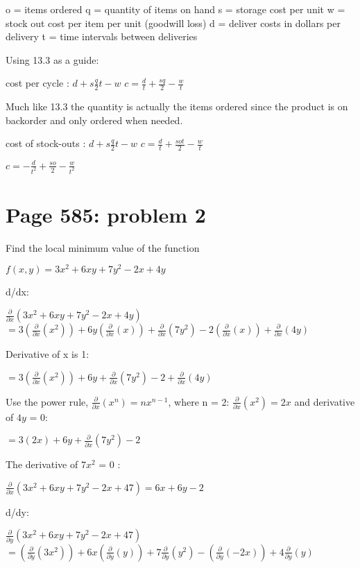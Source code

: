 \documentclass[]{article}
\begin{document}
o = items ordered q = quantity of items on hand s = storage cost per
unit w = stock out cost per item per unit (goodwill loss) d = deliver
costs in dollars per delivery t = time intervals between deliveries

Using 13.3 as a guide:

cost per cycle : \(d + s\frac{q}{2}t - w\)
\(c = \frac{d}{t} + \frac{sq}{2} - \frac{w}{t}\)

Much like 13.3 the quantity is actually the items ordered since the
product is on backorder and only ordered when needed.

cost of stock-outs : \(d + s\frac{q}{2}t - w\)
\(c = \frac{d}{t} + \frac{sot}{2} - \frac{w}{t}\)

\(c = -\frac{d}{t^2} + \frac{so}{2} - \frac{w}{t^2}\)

\newpage

\section{Page 585: problem 2}\label{page-585-problem-2}

Find the local minimum value of the function

\(f(x,y) = 3x^2 + 6xy + 7y^2 - 2x + 4y\)

d/dx:

\(\frac{\partial}{\partial x}(3x^2 + 6xy + 7y^2 - 2x + 4y)\)\\
\(= 3(\frac{\partial}{\partial x}(x^2)) + 6y(\frac{\partial}{\partial x}(x)) + \frac{\partial}{\partial x}(7y^2) - 2 (\frac{\partial}{\partial x}(x)) + \frac{\partial}{\partial x}(4y)\)

Derivative of x is 1:

\(= 3(\frac{\partial}{\partial x}(x^2)) + 6y + \frac{\partial}{\partial x}(7y^2) - 2 + \frac{\partial}{\partial x}(4y)\)

Use the power rule, \(\frac{\partial}{\partial x}(x^n) = nx^{n-1}\),
where n = 2: \(\frac{\partial}{\partial x} (x^2)= 2x\) and derivative of
\(4y\) = 0:

\(= 3 (2x) + 6y + \frac{\partial}{\partial x}(7y^2) - 2\)

The derivative of \(7x^2\) = 0 :

\(\frac{\partial}{\partial x}(3x^2 + 6xy + 7y^2 - 2x + 47) =6x + 6y -2\)

d/dy:

\(\frac{\partial}{\partial y}(3x^2 + 6xy + 7y^2 - 2x + 47)\)\\
\(= (\frac{\partial}{\partial y}(3x^2)) + 6x(\frac{\partial}{\partial y}(y)) + 7\frac{\partial}{\partial y}(y^2) - (\frac{\partial}{\partial y}(-2x)) + 4\frac{\partial}{\partial y}(y)\)
\end{document}
